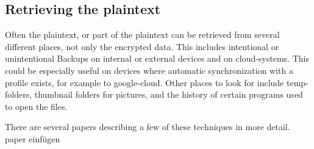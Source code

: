 \subsection{Retrieving the plaintext}
Often the plaintext, or part of the plaintext can be retrieved from several different places, not only the encrypted data. This includes intentional or unintentional Backups on internal or external devices and on cloud-systems. 
This could be especially useful on devices where automatic synchronization with a profile exists, for example to google-cloud.
Other places to look for include temp-folders, thumbnail folders for pictures, and
the history of certain programs used to open the files.

There are several papers describing a few of these techniques in more detail.
\\paper einfügen
